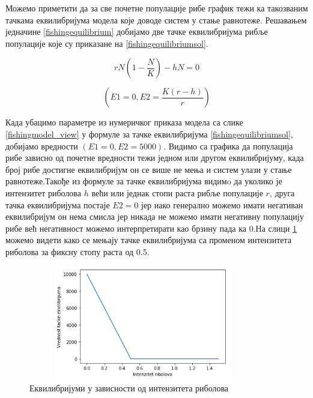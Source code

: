 \documentclass[a4paper]{article}
\begin{document}
{ Можемо приметити да за све почетне популације рибе график тежи ка такозваним тачкама еквилибријума модела које доводе систем у стање равнотеже. Решавањем једначине \ref{fishingequilibrium} добијамо две тачке еквилибријума рибље популације које су приказане на \ref{fishingequilibriumsol}.

\begin{equation}
    \label{fishingequilibrium}
    rN\left(1-\frac{N}{K}\right) - hN = 0
\end{equation}

\begin{equation}
    \label{fishingequilibriumsol}
     \left(E1 = 0,   E2 = \frac{K(r - h) }{r}\right)
\end{equation}

Када убацимо параметре из нумеричког приказа модела са слике \ref{fishingmodel_view} у формуле за тачке еквилибријума \ref{fishingequilibriumsol}, добијамо вредности $(E1=0, E2=5000)$. Видимо са графика да популација рибе зависно од почетне вредности тежи једном или другом еквилибријуму, када број рибе достигне еквилибријум он се више не мења и систем улази у стање равнотеже.Такође из формуле за тачке еквилибријума видимo да уколико је интензитет риболова $h$ већи или једнак стопи раста рибље популације $r$, друга тачка еквилибријума постаје $E2=0$ јер иако генерално можемо имати негативан еквилибријум он нема смисла јер никада не можемо имати негативну популацију рибе већ негативност можемо интерпретирати као брзину пада ка 0.На слици \ref{equilibriumsgraph} можемо видети како се мењају тачке еквилибријума са променом интензитета риболова за фиксну стопу раста од 0.5.

\begin{figure}[h!]
	\centering
	\includegraphics[width=10cm,height=5.0cm]{images/Equilibriums.png}
	\caption{Еквилибријуми у зависности од интензитета риболова}
	\label{equilibriumsgraph}
\end{figure}

}
\end{document}
